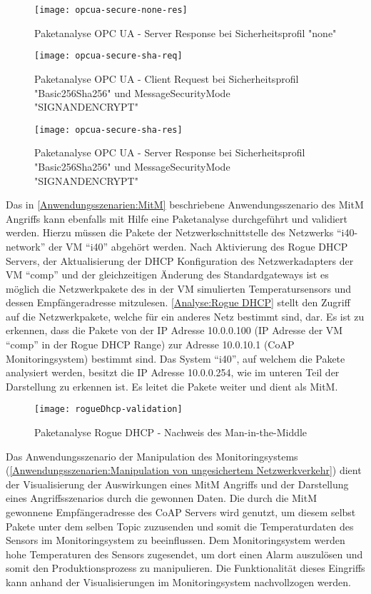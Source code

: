 \begin{figure}[h]
  \centering
  \texttt{[image: opcua-secure-none-res]}
  \caption{Paketanalyse OPC UA - Server Response bei Sicherheitsprofil "none"} 
  \label{Analyse:opcua-secure-none-res}
\end{figure}

\begin{figure}[h]
  \centering
  \texttt{[image: opcua-secure-sha-req]}
  \caption{Paketanalyse OPC UA - Client Request bei Sicherheitsprofil "Basic256Sha256" und MessageSecurityMode "SIGNANDENCRYPT"} 
  \label{Analyse:opcua-secure-sha-req}
\end{figure}

\begin{figure}[h]
  \centering
  \texttt{[image: opcua-secure-sha-res]}
  \caption{Paketanalyse OPC UA - Server Response bei Sicherheitsprofil "Basic256Sha256" und MessageSecurityMode "SIGNANDENCRYPT"} 
  \label{Analyse:opcua-secure-sha-res}
\end{figure}

Das in \autoref{Anwendungsszenarien:MitM} beschriebene Anwendungsszenario des \ac{MitM} Angriffs kann ebenfalls mit Hilfe eine Paketanalyse durchgeführt und validiert werden. Hierzu müssen die Pakete der Netzwerkschnittstelle des Netzwerks "`i40-network"' der \ac{VM} "`i40"' abgehört werden. Nach Aktivierung des Rogue \ac{DHCP} Servers, der Aktualisierung der \ac{DHCP} Konfiguration des Netzwerkadapters der \ac{VM} "`comp"' und der gleichzeitigen Änderung des Standardgateways ist es möglich die Netzwerkpakete des in der \ac{VM} simulierten Temperatursensors und dessen Empfängeradresse mitzulesen. \autoref{Analyse:Rogue DHCP} stellt den Zugriff auf die Netzwerkpakete, welche für ein anderes Netz bestimmt sind, dar. Es ist zu erkennen, dass die Pakete von der \ac{IP} Adresse 10.0.0.100 (\ac{IP} Adresse der \ac{VM} "`comp"' in der Rogue \ac{DHCP} Range) zur Adresse 10.0.10.1 (\ac{CoAP} Monitoringsystem) bestimmt sind. Das System "`i40"', auf welchem die Pakete analysiert werden, besitzt die \ac{IP} Adresse 10.0.0.254, wie im unteren Teil der Darstellung zu erkennen ist. Es leitet die Pakete weiter und dient als \ac{MitM}.

\begin{figure}[h]
  \centering
  \texttt{[image: rogueDhcp-validation]}
  \caption{Paketanalyse Rogue DHCP - Nachweis des Man-in-the-Middle} 
  \label{Analyse:Rogue DHCP}
\end{figure}

Das Anwendungsszenario der Manipulation des Monitoringsystems (\autoref{Anwendungsszenarien:Manipulation von ungesichertem Netzwerkverkehr}) dient der Visualisierung der Auswirkungen eines \ac{MitM} Angriffs und der Darstellung eines Angriffsszenarios durch die gewonnen Daten. Die durch die \ac{MitM} gewonnene Empfängeradresse des \ac{CoAP} Servers wird genutzt, um diesem selbst Pakete unter dem selben Topic zuzusenden und somit die Temperaturdaten des Sensors im Monitoringsystem zu beeinflussen. Dem Monitoringsystem werden hohe Temperaturen des Sensors zugesendet, um dort einen Alarm auszulösen und somit den Produktionsprozess zu manipulieren. Die Funktionalität dieses Eingriffs kann anhand der Visualisierungen im Monitoringsystem nachvollzogen werden.